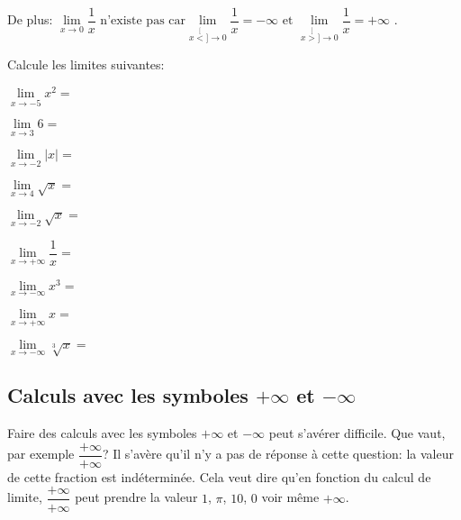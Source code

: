 \documentclass[a4paper,12pt]{report}
\newcommand{\tog}{\stackrel[<]{}{\to}}
\newcommand{\tod}{\stackrel[>]{}{\to}}
\newcommand{\pinf}{+\infty}
\newcommand{\minf}{-\infty}
\begin{document}
De plus: \(\lim\limits_{x\to 0}\dfrac{1}{x}\text{ n'existe pas car
}\lim\limits_{x\tog 0}\dfrac{1}{x}=\minf \text{ et }\lim\limits_{x\tod
0}\dfrac{1}{x}=\pinf\) .


\begin{exercice}
Calcule les limites suivantes:

\par \setlength{\columnseprule}{0 pt}
          \begin{minipage}[t]{\linewidth}
          \begin{multicols}{3}
\(\lim\limits_{x\to -5}x^2=\) \dotfill

\(\lim\limits_{x\to 3 }6=\) \dotfill

\(\lim\limits_{x\to -2}|x|=\) \dotfill

\(\lim\limits_{x\to 4}\sqrt{x}=\) \dotfill

\(\lim\limits_{x\to -2}\sqrt{x}=\) \dotfill

\(\lim\limits_{x\to \pinf}\dfrac{1}{x}=\) \dotfill

\(\lim\limits_{x\to \minf}x^3=\) \dotfill

\(\lim\limits_{x\to \pinf}x=\) \dotfill

\(\lim\limits_{x\to \minf}\sqrt[3]{x}=\) \dotfill



\end{multicols}\end{minipage}
\end{exercice}
\subsection{Calculs avec les symboles \(+\infty\) et \(-\infty\)}
\label{sec:org47d549b}

Faire des calculs avec les symboles \(+\infty\) et \(-\infty\) peut
s'avérer difficile. Que vaut, par exemple \(\dfrac{+\infty}{+\infty}\)? Il
s'avère qu'il n'y a pas de réponse à cette question: la valeur de
cette fraction est indéterminée. Cela veut dire qu'en fonction du
calcul de limite, \(\dfrac{+\infty}{+\infty}\) peut prendre la valeur \(1\),
\(\pi\), \(10\), \(0\) voir même \(+\infty\).
\end{document}
